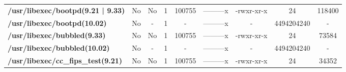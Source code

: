 \begin{center}
{\begin{tabular}{|>{\bfseries} l | C | C | C | C | C | C | C | C |}
					/usr/libexec/bootpd(9.21 | 9.33) & No & No & \color{green}1 & \color{red}100755 & \color{green}---------x & \color{red}-rwxr-xr-x & \color{green}24 & \color{red}118400\\ 
					/usr/libexec/bootpd(10.02) & No & - & 1 & - & ---------x & - & 4494204240 & -\\ 
					/usr/libexec/bubbled(9.33) & No & No & \color{green}1 & \color{red}100755 & \color{green}---------x & \color{red}-rwxr-xr-x & \color{green}24 & \color{red}73584\\ 
					/usr/libexec/bubbled(10.02) & No & - & 1 & - & ---------x & - & 4494204240 & -\\ 
					/usr/libexec/cc\_fips\_test(9.21) & No & No & \color{green}1 & \color{red}100755 & \color{green}---------x & \color{red}-rwxr-xr-x & \color{green}24 & \color{red}34352\\ 

			\end{tabular}
		}
	\end{center}



